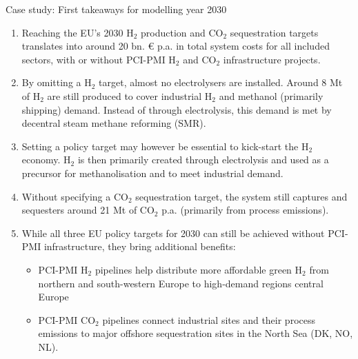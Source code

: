 \documentclass[10pt,aspectratio=169,dvipsnames]{beamer}
\begin{document}
\begin{frame}{Case study: First takeaways for modelling year 2030}
  \footnotesize
  \begin{enumerate}
    \setlength\itemsep{0.3em}
      \item Reaching the EU's 2030 H$_2$ production and CO$_2$ sequestration targets translates into around \alert{20 bn. € p.a. in total system costs} for all included sectors, with or without PCI-PMI H$_2$ and CO$_2$ infrastructure projects.
      \item By omitting a H$_2$ target, almost no electrolysers are installed. \alert{Around 8 Mt of H$_2$} are still produced to cover industrial H$_2$ and methanol (primarily shipping) demand. Instead of through electrolysis, this demand is met by decentral steam methane reforming (SMR). 
      \item Setting a policy target may however be essential to \alert{kick-start the H$_2$ economy}. H$_2$ is then primarily created through electrolysis and used as a \alert{precursor} for methanolisation and to meet industrial demand. 
      \item Without specifying a CO$_2$ sequestration target, the system still captures and sequesters \alert{around 21 Mt of CO$_2$ p.a.} (primarily from process emissions).
      \item While all three \alert{EU policy targets for 2030 can still be achieved} without PCI-PMI infrastructure, they bring additional benefits:
      \begin{itemize}
        \footnotesize
        \item PCI-PMI H$_2$ pipelines help distribute more \alert{affordable green H$_2$} from northern and south-western Europe to high-demand regions central Europe
        \item PCI-PMI CO$_2$ pipelines connect \alert{industrial sites} and their process emissions to \alert{major offshore sequestration sites in the North Sea} (DK, NO, NL).
      \end{itemize}
  \end{enumerate}

\end{frame}
\end{document}
